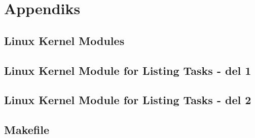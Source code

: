 \documentclass[main.tex]{subfile}
\begin{document}
\appendix
\section{Appendiks}
\subsection{Linux Kernel Modules}
\label{sec:simple.c}
\pagebreak

\subsection{Linux Kernel Module for Listing Tasks - del 1}
\label{sec:taskPrinter}
\pagebreak

\subsection{Linux Kernel Module for Listing Tasks - del 2}
\label{sec:taskAndChildPrinter}
\pagebreak

\subsection{Makefile}

\pagebreak
\end{document}
